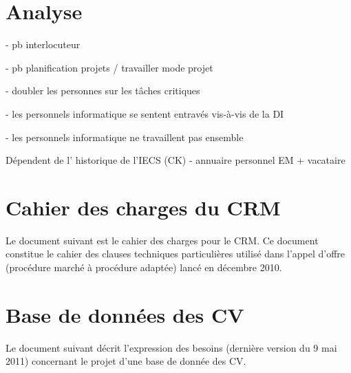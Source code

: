 \documentclass{book}
\begin{document}

\chapter{Analyse}

 - pb interlocuteur

- pb planification projets / travailler mode projet 

- doubler les personnes sur les tâches critiques

- les personnels informatique se sentent entravés vis-à-vis de la DI

- les personnels informatique ne travaillent pas ensemble

Dépendent de l' historique de l'IECS (CK)
- annuaire personnel EM + vacataire




\appendix

\chapter{Cahier des charges du CRM}
\label{ch:annexe-crm}

Le document suivant est le cahier des charges pour le CRM.
Ce document constitue le cahier des clauses techniques particulières
utilisé dans l'appel d'offre (procédure marché à procédure adaptée)
lancé en décembre 2010. 




\chapter{Base de données des CV}
\label{ch:rh-cvtheque}

Le document suivant décrit l'expression des besoins (dernière version du 9 mai 2011)
concernant le projet d'une base de donnée des CV.




\printindex
\end{document}
